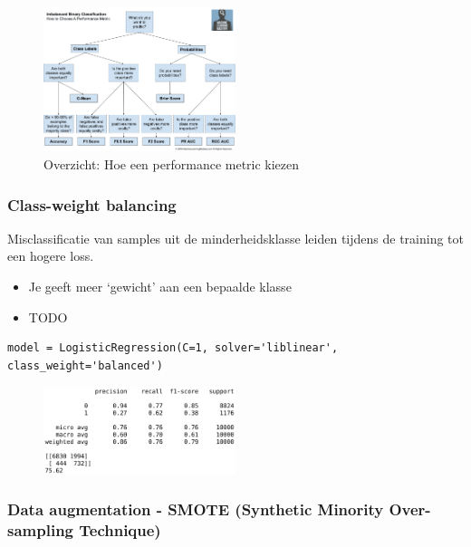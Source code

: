 \documentclass{article}
\begin{document}
\begin{figure}[H]
    \centering
    \includegraphics[width=0.5\textwidth]{how-to-choose-performance-metric.png}
    \caption{Overzicht: Hoe een performance metric kiezen}
\end{figure}


\subsubsection{Class-weight balancing}

Misclassificatie van samples uit de minderheidsklasse leiden tijdens de training tot een hogere loss.

\begin{itemize}
    \item Je geeft meer `gewicht' aan een bepaalde klasse
    \item TODO
\end{itemize}

\begin{verbatim}
model = LogisticRegression(C=1, solver='liblinear', class_weight='balanced')
\end{verbatim}

\begin{figure}[H]
    \centering
    \includegraphics[width=0.5\textwidth]{class-weight-balancing.png}
    \caption{}
\end{figure}

\subsubsection{Data augmentation - SMOTE (Synthetic Minority Over-sampling Technique)}
\end{document}
